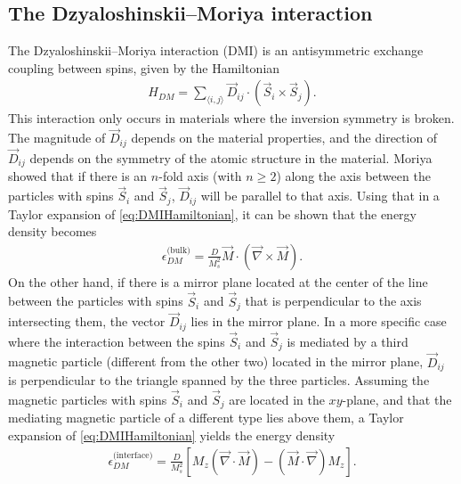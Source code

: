 \documentclass[12pt, a4paper, twoside, openright]{article}		%
\numberwithin{equation}{section}
\begin{document}
\subsection{The Dzyaloshinskii--Moriya interaction}
The Dzyaloshinskii--Moriya interaction (DMI) is an antisymmetric exchange coupling between spins, given by the Hamiltonian
\begin{align}
H_{DM} = \sum_{\langle i,j\rangle}\vec{D}_{ij}\cdot(\vec{S}_i\times\vec{S}_j). \label{eq:DMIHamiltonian}
\end{align}
This interaction only occurs in materials where the inversion symmetry is broken. The magnitude of $\vec{D}_{ij}$ depends on the material properties, and the direction of $\vec{D}_{ij}$ depends on the symmetry of the atomic structure in the material. Moriya showed \cite{Moriya1960} that if there is an $n$-fold axis (with $n \geq 2$) along the axis between the particles with spins $\vec{S}_i$ and $\vec{S}_j$, $\vec{D}_{ij}$ will be parallel to that axis. Using that in a Taylor expansion of \eqref{eq:DMIHamiltonian}, it can be shown that the energy density becomes
\begin{align}
\epsilon_{DM}^{\textrm{(bulk)}} = \frac{D}{M_s^2}\vec{M}\cdot(\vec{\nabla}\times\vec{M}).
\end{align}
On the other hand, if there is a mirror plane located at the center of the line between the particles with spins $\vec{S}_i$ and $\vec{S}_j$ that is perpendicular to the axis intersecting them, the vector $\vec{D}_{ij}$ lies in the mirror plane. In a more specific case where the interaction between the spins $\vec{S}_i$ and $\vec{S}_j$ is mediated by a third magnetic particle (different from the other two) located in the mirror plane, $\vec{D}_{ij}$ is perpendicular to the triangle spanned by the three particles. Assuming the magnetic particles with spins $\vec{S}_i$ and $\vec{S}_j$ are located in the $xy$-plane, and that the mediating magnetic particle of a different type lies above them, a Taylor expansion of \eqref{eq:DMIHamiltonian} yields the energy density
\begin{align}
\epsilon_{DM}^{\textrm{(interface)}} = \frac{D}{M_s^2}\left[M_z(\vec{\nabla}\cdot\vec{M})-(\vec{M}\cdot\vec{\nabla})M_z\right].
\end{align}
\end{document}
